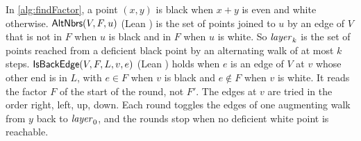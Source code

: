 In \cref{alg:findFactor}, a point $(x,y)$ is black when $x+y$ is even and white otherwise.
$\textsf{AltNbrs}(V,F,u)$ (Lean ) is the set of points joined to $u$ by an edge of $V$ that
is not in $F$ when $u$ is black and in $F$ when $u$ is white.
So $\mathit{layer}_k$ is the set of points reached from a deficient black point by an alternating
walk of at most $k$ steps.
$\textsf{IsBackEdge}(V,F,L,v,e)$ (Lean ) holds when $e$ is an edge of $V$ at $v$ whose other
end is in $L$, with $e\in F$ when $v$ is black and $e\notin F$ when $v$ is white.
It reads the factor $F$ of the start of the round, not $F'$.
The edges at $v$ are tried in the order right, left, up, down.
Each round toggles the edges of one augmenting walk from $y$ back to $\mathit{layer}_0$, and the
rounds stop when no deficient white point is reachable.
